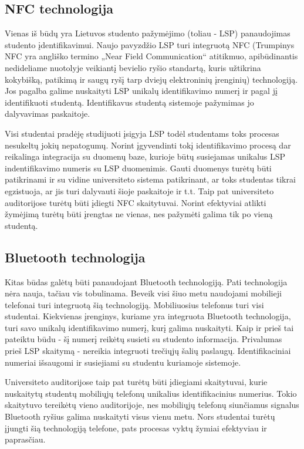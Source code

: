 \documentclass{VUMIFPSkursinis}
\begin{document}
\subsection{NFC technologija}
Vienas iš būdų yra Lietuvos studento pažymėjimo (toliau - LSP) panaudojimas studento įdentifikavimui. Naujo pavyzdžio LSP turi integruotą NFC (Trumpinys NFC yra angliško termino „Near Field Communication“ atitikmuo, apibūdinantis nedideliame nuotolyje veikiantį bevielio ryšio standartą, kuris užtikrina kokybišką, patikimą ir saugų ryšį tarp dviejų elektroninių įrenginių) technologiją.  Jos pagalba galime nuskaityti LSP unikalų identifikavimo numerį ir pagal jį identifikuoti studentą. Identifikavus studentą sistemoje pažymimas jo dalyvavimas paskaitoje.

Visi studentai pradėję studijuoti įsigyja LSP todėl studentams toks procesas nesukeltų jokių nepatogumų. Norint įgyvendinti tokį identifikavimo procesą dar reikalinga integracija su duomenų baze, kurioje būtų susiejamas unikalus LSP indentifikavimo numeris su LSP duomenimis. Gauti duomenys turėtų būti patikrinami ir su vidine universiteto sistema patikrinant, ar toks studentas tikrai egzistuoja, ar jis turi dalyvauti šioje paskaitoje ir t.t. Taip pat universiteto auditorijose turėtų būti įdiegti NFC skaitytuvai. Norint efektyviai atlikti žymėjimą turėtų būti įrengtas ne vienas, nes pažymėti galima tik po vieną studentą.

\subsection{Bluetooth technologija}
Kitas būdas galėtų būti panaudojant Bluetooth technologiją. Pati technologija nėra nauja, tačiau vis tobulinama. Beveik visi šiuo metu naudojami mobilieji telefonai turi integruotą šią technologiją. Mobiliuosius telefonus turi visi studentai. Kiekvienas įrenginys, kuriame yra integruota Bluetooth technologija, turi savo unikalų identifikavimo numerį, kurį galima nuskaityti. Kaip ir prieš tai pateiktu būdu - šį numerį reikėtų susieti su studento informacija. Privalumas prieš LSP skaitymą - nereikia integruoti trečiųjų šalių paslaugų. Identifikaciniai numeriai išsaugomi ir susiejiami su studentu kuriamoje sistemoje.

Universiteto auditorijose taip pat turėtų būti įdiegiami skaitytuvai, kurie nuskaitytų studentų mobiliųjų telefonų unikalius identifikacinius numerius. Tokio skaitytuvo tereikėtų vieno auditorijoje, nes mobiliųjų telefonų siunčiamus signalus Bluetooth ryšius galima nuskaityti visus vienu metu. Nors studentai turėtų įjungti šią technologiją telefone, pats procesas vyktų žymiai efektyviau ir paprasčiau.
\end{document}
